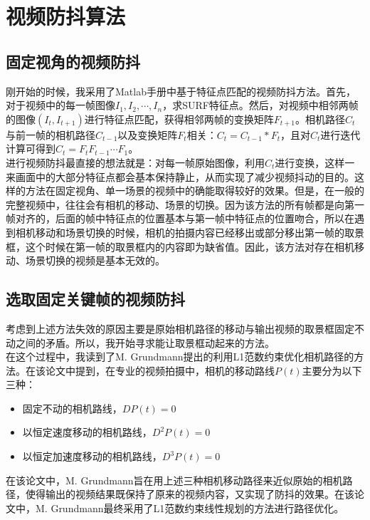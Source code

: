 \documentclass[journal, a4paper]{IEEEtran}
\begin{document}
\section{视频防抖算法}
\subsection{固定视角的视频防抖}
  刚开始的时候，我采用了Matlab手册中基于特征点匹配的视频防抖方法\cite{Matlab}。首先，对于视频中的每一帧图像$I_{1}, I_{2}, \cdots, I_{n}$，求SURF特征点。然后，对视频中相邻两帧的图像$(I_{t}, I_{t+1})$进行特征点匹配，获得相邻两帧的变换矩阵$F_{t+1}$。相机路径$C_{t}$与前一帧的相机路径$C_{t-1}$以及变换矩阵$F_{t}$相关：$C_{t}=C_{t-1}*F_{t}$，且对$C_{t}$进行迭代计算可得到$C_{t}=F_{t}F_{t-1}\cdots F_{1}$。 \\
    
    进行视频防抖最直接的想法就是：对每一帧原始图像，利用$C_{t}$进行变换，这样一来画面中的大部分特征点都会基本保持静止，从而实现了减少视频抖动的目的。这样的方法在固定视角、单一场景的视频中的确能取得较好的效果。但是，在一般的完整视频中，往往会有相机的移动、场景的切换。因为该方法的所有帧都是向第一帧对齐的，后面的帧中特征点的位置基本与第一帧中特征点的位置吻合，所以在遇到相机移动和场景切换的时候，相机的拍摄内容已经移出或部分移出第一帧的取景框，这个时候在第一帧的取景框内的内容即为缺省值。因此，该方法对存在相机移动、场景切换的视频是基本无效的。
    
\subsection{选取固定关键帧的视频防抖}
  考虑到上述方法失效的原因主要是原始相机路径的移动与输出视频的取景框固定不动之间的矛盾。所以，我开始寻求能让取景框动起来的方法。 \\
    
    在这个过程中，我读到了M. Grundmann提出的利用L1范数约束优化相机路径的方法\cite{L1Opt}。在该论文中提到，在专业的视频拍摄中，相机的移动路线$P(t)$主要分为以下三种：
    \begin{itemize}
    \item 固定不动的相机路线，$DP(t)=0$
    \item 以恒定速度移动的相机路线，$D^2P(t)=0$
    \item 以恒定加速度移动的相机路线，$D^3P(t)=0$
  \end{itemize}
    在该论文中，M. Grundmann旨在用上述三种相机移动路径来近似原始的相机路径，使得输出的视频结果既保持了原来的视频内容，又实现了防抖的效果。在该论文中，M. Grundmann最终采用了L1范数约束线性规划的方法进行路径优化。\\
    
\end{document}
